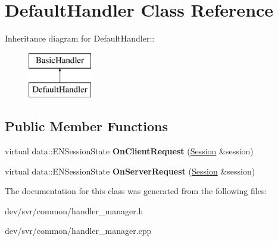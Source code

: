 \hypertarget{classDefaultHandler}{
\section{DefaultHandler Class Reference}
\label{classDefaultHandler}
}
Inheritance diagram for DefaultHandler::\begin{figure}[H]
\begin{center}
\leavevmode
\includegraphics[height=2cm]{classDefaultHandler}
\end{center}
\end{figure}
\subsection*{Public Member Functions}
\begin{DoxyCompactItemize}
\item 
\hypertarget{classDefaultHandler_afbb7ea561b9d612cf41516f348d11219}{
virtual data::ENSessionState {\bfseries OnClientRequest} (\hyperlink{classSession}{Session} \&session)}
\label{classDefaultHandler_afbb7ea561b9d612cf41516f348d11219}

\item 
\hypertarget{classDefaultHandler_a2c0e6387cd6c8e635cd60faa642344af}{
virtual data::ENSessionState {\bfseries OnServerRequest} (\hyperlink{classSession}{Session} \&session)}
\label{classDefaultHandler_a2c0e6387cd6c8e635cd60faa642344af}

\end{DoxyCompactItemize}


The documentation for this class was generated from the following files:\begin{DoxyCompactItemize}
\item 
dev/svr/common/handler\_\-manager.h\item 
dev/svr/common/handler\_\-manager.cpp\end{DoxyCompactItemize}
